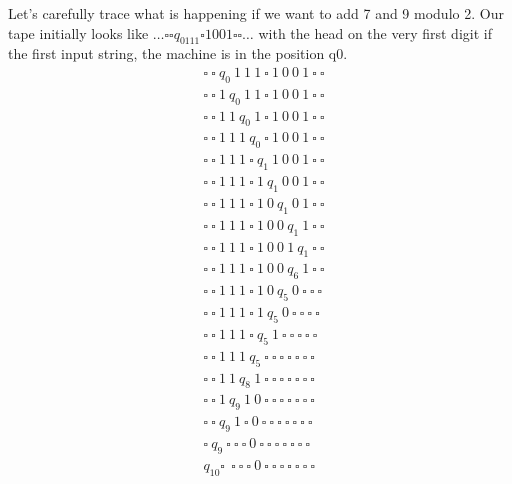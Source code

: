 \documentclass{article}
\begin{document}
\begin{framed}
    Let's carefully trace what is happening if we want to add 7 and 9 modulo 2. Our tape initially looks like $\dots \square \square q_0111 \square 1001 \square \square \dots$ with the head on the very first digit if the first input string, the machine is in the position q0.
    \begin{align*}
        &\square\ \square\ q_0\ 1\ 1\ 1\ \square\ 1\ 0\ 0\ 1\ \square\ \square\ \\
        &\square\ \square\ 1\ q_0\ 1\ 1\ \square\ 1\ 0\ 0\ 1\ \square\ \square\ \\
        &\square\ \square\ 1\ 1\ q_0\ 1\ \square\ 1\ 0\ 0\ 1\ \square\ \square\ \\
        &\square\ \square\ 1\ 1\ 1\ q_0\ \square\ 1\ 0\ 0\ 1\ \square\ \square\ \\
        &\square\ \square\ 1\ 1\ 1\ \square\ q_1\ 1\ 0\ 0\ 1\ \square\ \square\ \\
        &\square\ \square\ 1\ 1\ 1\ \square\ 1\ q_1\ 0\ 0\ 1\ \square\ \square\ \\
        &\square\ \square\ 1\ 1\ 1\ \square\ 1\ 0\ q_1\ 0\ 1\ \square\ \square\ \\
        &\square\ \square\ 1\ 1\ 1\ \square\ 1\ 0\ 0\ q_1\ 1\ \square\ \square\ \\
        &\square\ \square\ 1\ 1\ 1\ \square\ 1\ 0\ 0\ 1\ q_1\ \square\ \square\ \\
        &\square\ \square\ 1\ 1\ 1\ \square\ 1\ 0\ 0\ q_6\ 1\ \square\ \square\ \\
        &\square\ \square\ 1\ 1\ 1\ \square\ 1\ 0\ q_5\ 0\ \square\ \square\ \square\ \\
        &\square\ \square\ 1\ 1\ 1\ \square\ 1\ q_5\ 0\ \square\ \square\ \square\ \square\ \\
        &\square\ \square\ 1\ 1\ 1\ \square\ q_5\ 1\ \square\ \square\ \square\ \square\ \square\ \\
        &\square\ \square\ 1\ 1\ 1\ q_5\ \square\ \square\ \square\ \square\ \square\ \square\ \square\ \\
        &\square\ \square\ 1\ 1\ q_8\ 1\ \square\ \square\ \square\ \square\ \square\ \square\ \square\ \\
        &\square\ \square\ 1\ q_9\ 1\ 0\ \square\ \square\ \square\ \square\ \square\ \square\ \square\ \\
        &\square\ \square\ q_9\ 1\  \square\ 0\ \square\ \square\ \square\ \square\ \square\ \square\ \square\ \\
        &\square\ q_9\ \square\  \square\ \square\ 0\ \square\ \square\ \square\ \square\ \square\ \square\ \square\ \\
        &q_{10}\square\ \ \square\  \square\ \square\ 0\ \square\ \square\ \square\ \square\ \square\ \square\ \square\ \\
\end{align*}
\end{framed}
\end{document}
